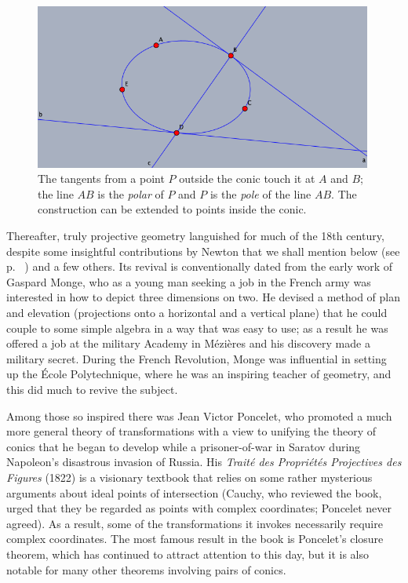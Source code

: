 \bigskip
\begin{center}
    \begin{figure}
   \begin{center}  \includegraphics[width=30em]{poleandpolar.png} 
   \end{center}
     \protect \caption{The tangents from a point $P$ outside the conic touch it at $A$ and $B$; the line $AB$ is the \emph{polar} of $P$ and $P$ is the \emph{pole} of the line $AB$. The construction can be extended to points inside the conic.}
      \label{figpolepolar}
     \end{figure}
\end{center}

\bigskip 


Thereafter, truly projective geometry languished for much of the 18th century, despite some insightful contributions by Newton that we shall mention below (see p. ~\pageref{Newtonconics}) and a few others. Its revival is conventionally dated from the early work of Gaspard Monge, who as a young man seeking a job in the French army was  interested in how to depict three dimensions on two. He devised a method of plan and elevation (projections onto a horizontal and a vertical plane) that he could couple to some simple algebra in a way that was easy to use; as a result he was offered a job at the military Academy in M\'ezi\`eres and his discovery made a military secret. During the French Revolution, Monge was influential in setting up the \'Ecole Polytechnique, where he was an inspiring teacher of geometry, and this did much to revive the subject. 

Among those so inspired there was Jean Victor Poncelet, who promoted a much more general theory of transformations with a view to unifying the theory of conics that he began to develop while a prisoner-of-war in Saratov during Napoleon's disastrous invasion of Russia. His \emph{Trait\'e des Propri\'et\'es Projectives des Figures} (1822) is a visionary textbook that relies on some rather mysterious arguments about ideal points of intersection (Cauchy, who reviewed the book, urged that they be regarded as points with complex coordinates; Poncelet never agreed). As a result, some of the transformations it invokes necessarily require complex coordinates. The most famous result in the book is Poncelet's closure theorem, which has continued to attract attention to this day, but it is also notable for many other theorems involving pairs of conics.


